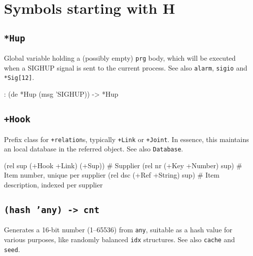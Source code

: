 %
%
%



\chapter{Symbols starting with H}
\label{cha:func-ref-H-functions-starting-with-H}

 
\section*{\texttt{*Hup}}
\label{sec:func-ref-H-*Hup}


Global variable holding a (possibly empty) \texttt{prg} body, which will be
executed when a SIGHUP signal is sent to the current process. See also
\texttt{alarm}, \texttt{sigio} and \texttt{*Sig[12]}.


\begin{wideverbatim}
: (de *Hup (msg 'SIGHUP))
-> *Hup
\end{wideverbatim}

 
\section*{\texttt{+Hook}}
\label{sec:func-ref-H-+Hook}


Prefix class for \texttt{+relation}s, typically \texttt{+Link} or
\texttt{+Joint}. In essence, this maintains an local database in the
referred object. See also \texttt{Database}.


\begin{wideverbatim}
(rel sup (+Hook +Link) (+Sup))   # Supplier
(rel nr (+Key +Number) sup)      # Item number, unique per supplier
(rel dsc (+Ref +String) sup)     # Item description, indexed per supplier
\end{wideverbatim}

 
\section*{\texttt{(hash 'any) -> cnt}}
\label{sec:func-ref-H-(hash 'any) -> cnt}


Generates a 16-bit number (1--65536) from \texttt{any}, suitable as a hash
value for various purposes, like randomly balanced \texttt{idx} structures. See
also \texttt{cache} and \texttt{seed}.



